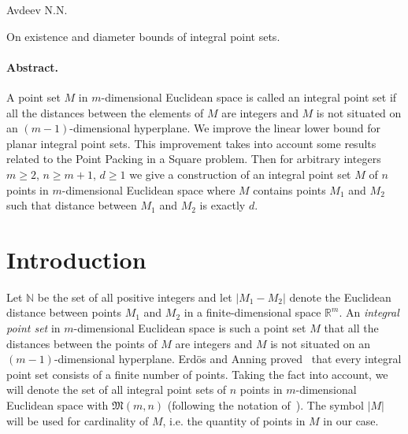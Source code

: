 \documentclass[a4paper,14pt]{article} %
\theoremstyle{plain}
\theoremstyle{definition}
\begin{document}
\renewcommand{\bibname}{Список цитированной литературы}
\renewcommand\refname{\bibname}

Avdeev N.N.

On existence and diameter bounds of integral point sets.

\paragraph{Abstract.}
A point set $M$ in $m$-dimensional Euclidean space is called an integral point set if all the distances between the
elements of $M$ are integers and $M$ is not situated on an $(m-1)$-dimensional hyperplane.
We improve the linear lower bound for planar integral point sets.
This improvement takes into account some results related to the Point Packing in a Square problem.
Then for arbitrary integers $m \geq 2$, $n \geq m+1$, $d \geq 1$
we give a construction of an integral point set $M$ of $n$ points in $m$-dimensional Euclidean space
where $M$ contains points $M_1$ and $M_2$ such that distance between $M_1$ and $M_2$ is exactly $d$.



\section{Introduction}
Let $\mathbb{N}$ be the set of all positive integers and let $|M_1 - M_2|$ denote the Euclidean distance
between points $M_1$ and $M_2$ in a finite-dimensional space $\mathbb{R}^m$.
An \textit{integral point set} in $m$-dimensional Euclidean space is such a point set $M$ that all the distances between the
points of $M$ are integers and $M$ is not situated on an $(m-1)$-dimensional hyperplane.
Erd\"os and Anning proved~\cite{anning1945integral,erdos1945integral} that every integral point set consists of a finite number of points.
Taking the fact into account, we will denote the set of all integral point sets of $n$ points in $m$-dimensional Euclidean space with
$\mathfrak{M}(m,n)$ (following the notation of~\cite{our-vmmsh-2018}).
The symbol $|M|$ will be used for cardinality of $M$, i.e. the quantity of points in $M$ in our case.
\end{document}
